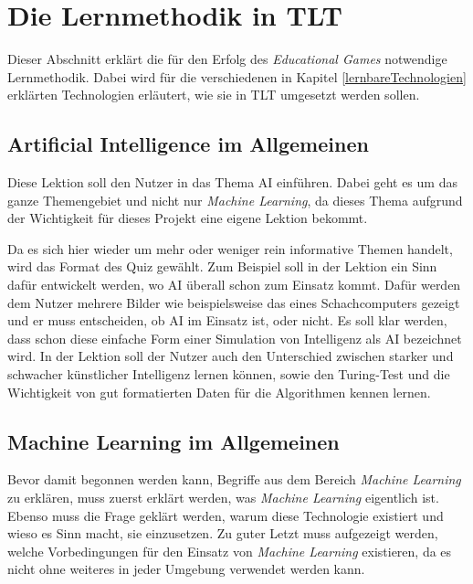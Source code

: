 \chapter{Die Lernmethodik in TLT}
\label{lernmethodik_chapter}

Dieser Abschnitt erklärt die für den Erfolg des \textit{Educational Games} notwendige Lernmethodik. Dabei wird für die verschiedenen in Kapitel \ref{lernbareTechnologien} erklärten Technologien erläutert, wie sie in TLT umgesetzt werden sollen.

\section{Artificial Intelligence im Allgemeinen}
\label{lm_aiallgemein}

Diese Lektion soll den Nutzer in das Thema AI einführen. Dabei geht es um das ganze Themengebiet und nicht nur \textit{Machine Learning}, da dieses Thema aufgrund der Wichtigkeit für dieses Projekt eine eigene Lektion bekommt.

Da es sich hier wieder um mehr oder weniger rein informative Themen handelt, wird das Format des Quiz gewählt. Zum Beispiel soll in der Lektion ein Sinn dafür entwickelt werden, wo AI überall schon zum Einsatz kommt. Dafür werden dem Nutzer mehrere Bilder wie beispielsweise das eines Schachcomputers gezeigt und er muss entscheiden, ob AI im Einsatz ist, oder nicht. Es soll klar werden, dass schon diese einfache Form einer Simulation von Intelligenz als AI bezeichnet wird. In der Lektion soll der Nutzer auch den Unterschied zwischen starker und schwacher künstlicher Intelligenz lernen können, sowie den Turing-Test und die Wichtigkeit von gut formatierten Daten für die Algorithmen kennen lernen.

\section{Machine Learning im Allgemeinen}
\label{lm_mlallgemein}

Bevor damit begonnen werden kann, Begriffe aus dem Bereich \textit{Machine Learning} zu erklären, muss zuerst erklärt werden, was \textit{Machine Learning} eigentlich ist. Ebenso muss die Frage geklärt werden, warum diese Technologie existiert und wieso es Sinn macht, sie einzusetzen. Zu guter Letzt muss aufgezeigt werden, welche Vorbedingungen für den Einsatz von \textit{Machine Learning} existieren, da es nicht ohne weiteres in jeder Umgebung verwendet werden kann.

